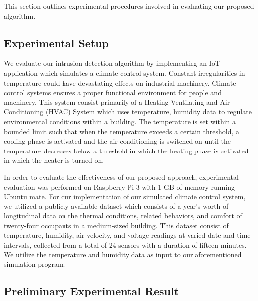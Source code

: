 This section outlines experimental procedures involved in evaluating our proposed algorithm. 


\subsection{Experimental Setup}

We evaluate our intrusion detection algorithm by implementing an IoT application which simulates a climate control system. Constant irregularities in temperature could have devastating effects on industrial machinery. Climate control systems ensures a proper functional environment for people and machinery. This system consist primarily of a Heating Ventilating and Air Conditioning (HVAC) System which uses temperature, humidity data to regulate environmental conditions within a building. The temperature is set within a bounded limit such that when the temperature exceeds a certain threshold, a cooling phase is activated and the air conditioning is switched on until the temperature decreases below a threshold in which the heating phase is activated in which the heater is turned on.

\par In order to evaluate the effectiveness of our proposed approach, experimental  evaluation was performed on Raspberry Pi 3 with 1 GB of memory running Ubuntu mate. For our implementation of our simulated climate control system, we utilized a publicly available dataset \cite{LANGEVIN201594} which consists of a year's worth of longitudinal data on the thermal conditions, related behaviors, and comfort of twenty-four occupants in a medium-sized building. This dataset consist of temperature, humidity, air velocity, and voltage readings at varied date and time intervals, collected from a total of 24 sensors with a duration of fifteen minutes. We utilize the temperature and humidity data as input to our aforementioned simulation program.






\subsection{Preliminary Experimental Result}

